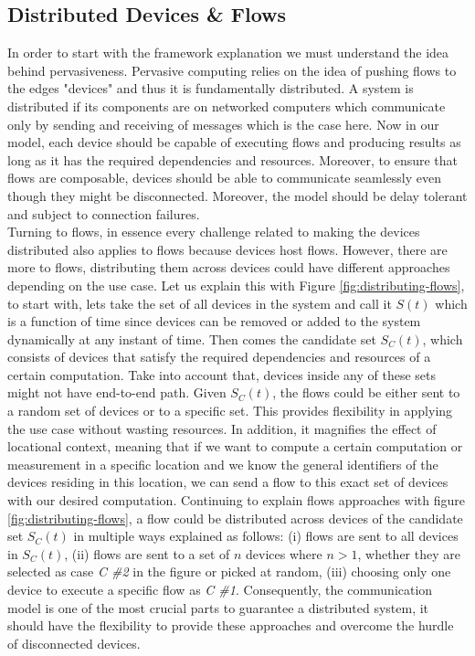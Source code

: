 \subsection{Distributed Devices \& Flows}
In order to start with the framework explanation we must understand the idea behind pervasiveness. Pervasive computing relies on the idea of pushing flows to the edges "devices" and thus it is fundamentally distributed. A system is distributed if its components  are on networked computers which communicate only by sending and receiving of messages \cite{DSYS} which is the case here. Now in our model, each device should be capable of executing flows and producing results as long as it has the required dependencies and resources. Moreover, to ensure that flows are composable, devices should be able to communicate seamlessly even though they might be disconnected. Moreover, the model should be delay tolerant and subject to connection failures.\\



\noindent Turning to flows, in essence every challenge related to making the devices distributed also applies to flows because devices host flows. However, there are more to flows, distributing them across devices could have different approaches depending on the use case. Let us explain this with Figure \ref{fig:distributing-flows}, to start with, lets take the set of all devices in the system and call it \(S(t)\) which is a function of time since devices can be removed or added to the system dynamically at any instant of time. Then comes the candidate set \(S_C(t)\), which consists of devices that satisfy the required dependencies and resources of a certain computation. Take into account that, devices inside any of these sets might not have end-to-end path. Given \(S_C(t)\), the flows could be either sent to a random set of devices or to a specific set. This provides flexibility in applying the use case without wasting resources. In addition, it magnifies the effect of locational context, meaning that if we want to compute a certain computation or measurement in a specific location  and we know the general identifiers of  the  devices residing in this location, we can send a flow to this exact set of devices with our desired computation. Continuing to explain flows approaches with figure \ref{fig:distributing-flows}, a flow could be distributed across devices of the candidate set  \(S_C(t)\) in multiple ways explained as follows: (i) flows are sent to all devices in  \(S_C(t)\), (ii) flows are sent to a set of  \(n\)  devices where \(n > 1\), whether they are selected as case \textit{C \#2} in the figure or picked at random, (iii) choosing only one device to execute a specific flow as \textit{C \#1}. Consequently, the communication model is one of the most crucial parts to guarantee a distributed system, it should have the flexibility to provide these approaches and overcome the hurdle of disconnected devices.
 
